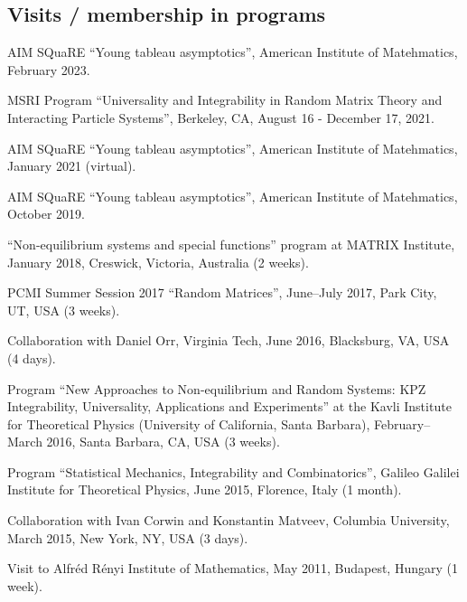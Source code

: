 \documentclass[letterpaper,11pt]{article}
\begin{document}
\subsection*{Visits / membership in programs}

\begin{etaremune}
	\item AIM SQuaRE ``Young tableau asymptotics'', American Institute of Matehmatics, 
	February 2023.
	\item 
	MSRI Program ``Universality and Integrability in Random Matrix Theory and Interacting Particle Systems'', Berkeley, CA, August 16 - December 17, 2021.
	\item 
	AIM SQuaRE ``Young tableau asymptotics'', American Institute of Matehmatics, 
	January 2021 (virtual).
	\item 
	AIM SQuaRE ``Young tableau asymptotics'', American Institute of Matehmatics, 
	October 2019.
	\item 
		``Non-equilibrium systems and special functions'' program at MATRIX Institute,
		January 2018, 
		Creswick, Victoria, Australia (2 weeks).
	\item
	      PCMI Summer Session 2017 ``Random Matrices'', June--July 2017,
	      Park City, UT, USA (3 weeks).
	\item
	      Collaboration with Daniel Orr, Virginia Tech, June 2016,
	      Blacksburg, VA, USA (4 days).
	\item
	      Program ``New Approaches to Non-equilibrium and Random Systems:
	      KPZ Integrability, Universality, Applications and Experiments'' at the Kavli
	      Institute for Theoretical Physics (University of California, Santa Barbara),
	      February--March 2016, Santa Barbara, CA, USA (3 weeks).
	\item
	      Program ``Statistical Mechanics, Integrability and
	      Combinatorics'', Galileo Galilei Institute for Theoretical Physics, June 2015,
	      Florence, Italy (1 month).
	\item
	      Collaboration with Ivan Corwin and Konstantin Matveev, Columbia
	      University, March 2015, New York, NY, USA (3 days).
	\item
	      Visit to Alfr\'ed R\'enyi Institute of Mathematics, May 2011,
	      Budapest, Hungary (1 week).
\end{etaremune}

\end{document}
